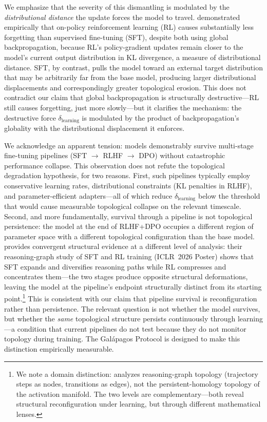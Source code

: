 \documentclass{article}
\begin{document}
We emphasize that the severity of this dismantling is modulated by the \emph{distributional distance} the update forces the model to travel. \citet{Shenfeld2025RLRazor} demonstrated empirically that on-policy reinforcement learning (RL) causes substantially less forgetting than supervised fine-tuning (SFT), despite both using global backpropagation, because RL's policy-gradient updates remain closer to the model's current output distribution in KL divergence, a measure of distributional distance. SFT, by contrast, pulls the model toward an external target distribution that may be arbitrarily far from the base model, producing larger distributional displacements and correspondingly greater topological erosion. This does not contradict our claim that global backpropagation is structurally destructive---RL still causes forgetting, just more slowly---but it clarifies the mechanism: the destructive force $\delta_{\text{learning}}$ is modulated by the product of backpropagation's globality with the distributional displacement it enforces.

We acknowledge an apparent tension: models demonstrably survive multi-stage fine-tuning pipelines (SFT $\to$ RLHF $\to$ DPO) without catastrophic performance collapse. This observation does not refute the topological degradation hypothesis, for two reasons. First, such pipelines typically employ conservative learning rates, distributional constraints (KL penalties in RLHF), and parameter-efficient adapters---all of which reduce $\delta_{\text{learning}}$ below the threshold that would cause measurable topological collapse on the relevant timescale. Second, and more fundamentally, survival through a pipeline is not topological persistence: the model at the end of RLHF+DPO occupies a different region of parameter space with a different topological configuration than the base model. \citet{Matsutani2026rlsqueezes} provides convergent structural evidence at a different level of analysis: their reasoning-graph study of SFT and RL training (ICLR~2026 Poster) shows that SFT expands and diversifies reasoning paths while RL compresses and concentrates them---the two stages produce opposite structural deformations, leaving the model at the pipeline's endpoint structurally distinct from its starting point.\footnote{We note a domain distinction: \citet{Matsutani2026rlsqueezes} analyzes reasoning-graph topology (trajectory steps as nodes, transitions as edges), not the persistent-homology topology of the activation manifold. The two levels are complementary---both reveal structural reconfiguration under learning, but through different mathematical lenses.} This is consistent with our claim that pipeline survival is reconfiguration rather than persistence. The relevant question is not whether the model survives, but whether the \emph{same} topological structure persists continuously through learning---a condition that current pipelines do not test because they do not monitor topology during training. The Gal\'apagos Protocol is designed to make this distinction empirically measurable.
\end{document}
